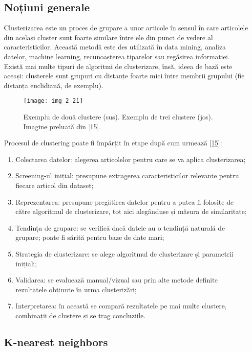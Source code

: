 \subsection{Noțiuni generale}

Clusterizarea este un proces de grupare a unor articole în sensul în care articolele din același cluster sunt foarte similare între ele din punct de vedere al caracteristicilor. Această metodă este des utilizată în data mining, analiza datelor, machine learning, recunoașterea tiparelor sau regăsirea informației. Există mai multe tipuri de algoritmi de clusterizare, însă, ideea de bază este aceași: clusterele sunt grupuri cu distanțe foarte mici între membrii grupului (fie distanța euclidiană, de exemplu).

\begin{figure}[!h]
	\centering
	\texttt{[image: img\_2\_21]}
	\caption[Exemplu clustere]{Exemplu de două clustere (sus). Exemplu de trei clustere (jos). Imagine preluată din \hyperlink{dataclusteringtechniques}{[15]}.}
\end{figure}  

Procesul de clustering poate fi împărțit în etape după cum urmează \hyperlink{dataclusteringtechniques}{[15]}:
\begin{enumerate}
	\item Colectarea datelor: alegerea articolelor pentru care se va aplica clusterizarea;
	\item Screening-ul inițial: presupune extragerea caracteristicilor relevante pentru fiecare articol din dataset;
	\item Reprezentarea: presupune pregătirea datelor pentru a putea fi folosite de către algoritmul de clusterizare, tot aici alegânduse și măsura de similaritate;
	\item Tendința de grupare: se verifică dacă datele au o tendință naturală de grupare; poate fi sărită pentru baze de date mari;
	\item Strategia de clusterizare: se alege algoritmul de clusterizare și parametrii inițiali;
	\item Validarea: se evaluează manual/vizual sau prin alte metode definite rezultatele obținute în urma clusterizări;
	\item Interpretarea: în această se compară rezultatele pe mai multe clustere, combinații de clustere și se trag concluziile.
\end{enumerate}

\subsection{K-nearest neighbors}
